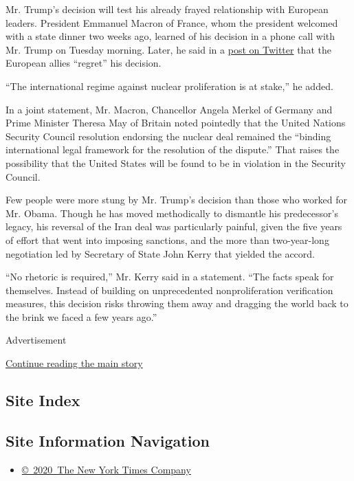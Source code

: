 Mr. Trump's decision will test his already frayed relationship with
European leaders. President Emmanuel Macron of France, whom the
president welcomed with a state dinner two weeks ago, learned of his
decision in a phone call with Mr. Trump on Tuesday morning. Later, he
said in a
\href{https://twitter.com/EmmanuelMacron/status/993921478998544384}{post
on Twitter} that the European allies ``regret'' his decision.

``The international regime against nuclear proliferation is at stake,''
he added.

In a joint statement, Mr. Macron, Chancellor Angela Merkel of Germany
and Prime Minister Theresa May of Britain noted pointedly that the
United Nations Security Council resolution endorsing the nuclear deal
remained the ``binding international legal framework for the resolution
of the dispute.'' That raises the possibility that the United States
will be found to be in violation in the Security Council.

Few people were more stung by Mr. Trump's decision than those who worked
for Mr. Obama. Though he has moved methodically to dismantle his
predecessor's legacy, his reversal of the Iran deal was particularly
painful, given the five years of effort that went into imposing
sanctions, and the more than two-year-long negotiation led by Secretary
of State John Kerry that yielded the accord.

``No rhetoric is required,'' Mr. Kerry said in a statement. ``The facts
speak for themselves. Instead of building on unprecedented
nonproliferation verification measures, this decision risks throwing
them away and dragging the world back to the brink we faced a few years
ago.''

Advertisement

\protect\hyperlink{after-bottom}{Continue reading the main story}

\hypertarget{site-index}{%
\subsection{Site Index}\label{site-index}}

\hypertarget{site-information-navigation}{%
\subsection{Site Information
Navigation}\label{site-information-navigation}}

\begin{itemize}
\tightlist
\item
  \href{https://help.nytimes.com/hc/en-us/articles/115014792127-Copyright-notice}{©~2020~The
  New York Times Company}
\end{itemize}

